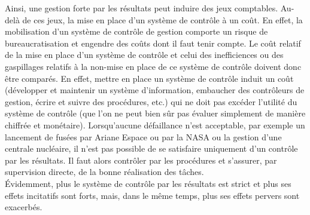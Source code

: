 \documentclass{tufte-handout}
\begin{document}
\begin{enumerate}
Ainsi, une gestion forte par les résultats peut induire des jeux comptables. Au-delà de ces jeux, la mise en place d’un système de contrôle à un coût. En effet, la mobilisation d’un système de contrôle de gestion comporte un risque de bureaucratisation et engendre des coûts dont il faut tenir compte. Le coût relatif de la mise en place d’un système de contrôle et celui des inefficiences ou des gaspillages relatifs à la non-mise en place de ce système de contrôle doivent donc être comparés. En effet, mettre en place un système de contrôle induit un coût (développer et maintenir un système d’information, embaucher des contrôleurs de gestion, écrire et suivre des procédures, etc.) qui ne doit pas excéder l’utilité du système de contrôle (que l’on ne peut bien sûr pas évaluer simplement de manière chiffrée et monétaire). Lorsqu’aucune défaillance n’est acceptable, par exemple un lancement de fusées par Ariane Espace ou par la NASA ou la gestion d’une centrale nucléaire, il n’est pas possible de se satisfaire uniquement d’un contrôle par les résultats. Il faut alors contrôler par les procédures et s’assurer, par supervision directe, de la bonne réalisation des tâches.\\

Évidemment, plus le système de contrôle par les résultats est strict et plus ses effets incitatifs sont forts, mais, dans le même temps, plus ses effets pervers sont exacerbés.\\
\end{enumerate}
\end{document}
